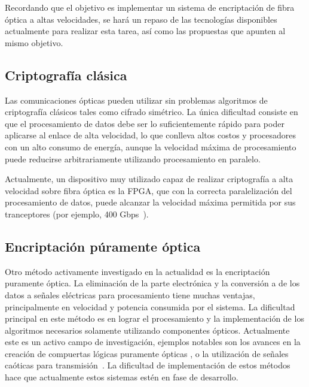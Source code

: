 Recordando que el objetivo es implementar un sistema de encriptación de fibra óptica a altas velocidades, se hará un repaso de las tecnologías disponibles actualmente para realizar esta tarea, así como las propuestas que apunten al mismo objetivo.

\subsection{Criptografía clásica}
Las comunicaciones ópticas pueden utilizar sin problemas algoritmos de criptografía clásicos tales como cifrado simétrico. La única dificultad consiste en que el procesamiento de datos debe ser lo suficientemente rápido para poder aplicarse al enlace de alta velocidad, lo que conlleva altos costos y procesadores con un alto consumo de energía, aunque la velocidad máxima de procesamiento puede reducirse arbitrariamente utilizando procesamiento en paralelo.

Actualmente, un dispositivo muy utilizado capaz de realizar criptografía a alta velocidad sobre fibra óptica es la FPGA, que con la correcta paralelización del procesamiento de datos, puede alcanzar la velocidad máxima permitida por sus tranceptores (por ejemplo, 400 Gbps~\cite{Algotronix}).

\subsection{Encriptación púramente óptica}
\label{optocry}
Otro método activamente investigado en la actualidad es la encriptación puramente óptica. La eliminación de la parte electrónica y la conversión a de los datos a señales eléctricas para procesamiento tiene muchas ventajas, principalmente en velocidad y potencia consumida por el sistema.
La dificultad principal en este método es en lograr el procesamiento y la implementación de los algoritmos necesarios solamente utilizando componentes ópticos. Actualmente este es un activo campo de investigación, ejemplos notables son los avances en la creación de compuertas lógicas puramente ópticas \cite{jung2008demonstration}, o la utilización de señales caóticas para transmisión~\cite{liu2002synchronized}.
La dificultad de implementación de estos métodos hace que actualmente estos sistemas estén en fase de desarrollo.


